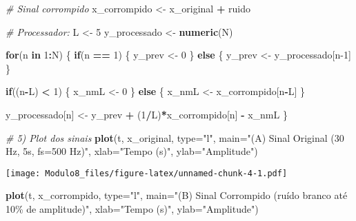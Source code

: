 \documentclass[
]{article}
\newenvironment{Shaded}{\begin{snugshade}}{\end{snugshade}}
\newcommand{\AttributeTok}[1]{\textcolor[rgb]{0.13,0.29,0.53}{#1}}
\newcommand{\CommentTok}[1]{\textcolor[rgb]{0.56,0.35,0.01}{\textit{#1}}}
\newcommand{\ControlFlowTok}[1]{\textcolor[rgb]{0.13,0.29,0.53}{\textbf{#1}}}
\newcommand{\DecValTok}[1]{\textcolor[rgb]{0.00,0.00,0.81}{#1}}
\newcommand{\FunctionTok}[1]{\textcolor[rgb]{0.13,0.29,0.53}{\textbf{#1}}}
\newcommand{\NormalTok}[1]{#1}
\newcommand{\OtherTok}[1]{\textcolor[rgb]{0.56,0.35,0.01}{#1}}
\newcommand{\SpecialCharTok}[1]{\textcolor[rgb]{0.81,0.36,0.00}{\textbf{#1}}}
\newcommand{\StringTok}[1]{\textcolor[rgb]{0.31,0.60,0.02}{#1}}
\begin{document}
\begin{Shaded}
\begin{Highlighting}[]
\CommentTok{\# Sinal corrompido}
\NormalTok{x\_corrompido }\OtherTok{\textless{}{-}}\NormalTok{ x\_original }\SpecialCharTok{+}\NormalTok{ ruido}

\CommentTok{\# Processador:}
\NormalTok{L }\OtherTok{\textless{}{-}} \DecValTok{5}
\NormalTok{y\_processado }\OtherTok{\textless{}{-}} \FunctionTok{numeric}\NormalTok{(N)}

\ControlFlowTok{for}\NormalTok{(n }\ControlFlowTok{in} \DecValTok{1}\SpecialCharTok{:}\NormalTok{N) \{}
  \ControlFlowTok{if}\NormalTok{(n }\SpecialCharTok{==} \DecValTok{1}\NormalTok{) \{}
\NormalTok{    y\_prev }\OtherTok{\textless{}{-}} \DecValTok{0}
\NormalTok{  \} }\ControlFlowTok{else}\NormalTok{ \{}
\NormalTok{    y\_prev }\OtherTok{\textless{}{-}}\NormalTok{ y\_processado[n}\DecValTok{{-}1}\NormalTok{]}
\NormalTok{  \}}
  
  \ControlFlowTok{if}\NormalTok{((n}\SpecialCharTok{{-}}\NormalTok{L) }\SpecialCharTok{\textless{}} \DecValTok{1}\NormalTok{) \{}
\NormalTok{    x\_nmL }\OtherTok{\textless{}{-}} \DecValTok{0}
\NormalTok{  \} }\ControlFlowTok{else}\NormalTok{ \{}
\NormalTok{    x\_nmL }\OtherTok{\textless{}{-}}\NormalTok{ x\_corrompido[n}\SpecialCharTok{{-}}\NormalTok{L]}
\NormalTok{  \}}
  
\NormalTok{  y\_processado[n] }\OtherTok{\textless{}{-}}\NormalTok{ y\_prev }\SpecialCharTok{+}\NormalTok{ (}\DecValTok{1}\SpecialCharTok{/}\NormalTok{L)}\SpecialCharTok{*}\NormalTok{x\_corrompido[n] }\SpecialCharTok{{-}}\NormalTok{ x\_nmL}
\NormalTok{\}}

\CommentTok{\# 5) Plot dos sinais}
\FunctionTok{plot}\NormalTok{(t, x\_original, }\AttributeTok{type=}\StringTok{"l"}\NormalTok{, }
     \AttributeTok{main=}\StringTok{"(A) Sinal Original (30 Hz, 5s, fs=500 Hz)"}\NormalTok{,}
     \AttributeTok{xlab=}\StringTok{"Tempo (s)"}\NormalTok{, }\AttributeTok{ylab=}\StringTok{"Amplitude"}\NormalTok{)}
\end{Highlighting}
\end{Shaded}

\texttt{[image: Modulo8\_files/figure-latex/unnamed-chunk-4-1.pdf]}

\begin{Shaded}
\begin{Highlighting}[]
\FunctionTok{plot}\NormalTok{(t, x\_corrompido, }\AttributeTok{type=}\StringTok{"l"}\NormalTok{,}
     \AttributeTok{main=}\StringTok{"(B) Sinal Corrompido (ruído branco até 10\% de amplitude)"}\NormalTok{,}
     \AttributeTok{xlab=}\StringTok{"Tempo (s)"}\NormalTok{, }\AttributeTok{ylab=}\StringTok{"Amplitude"}\NormalTok{)}
\end{Highlighting}
\end{Shaded}
\end{document}
